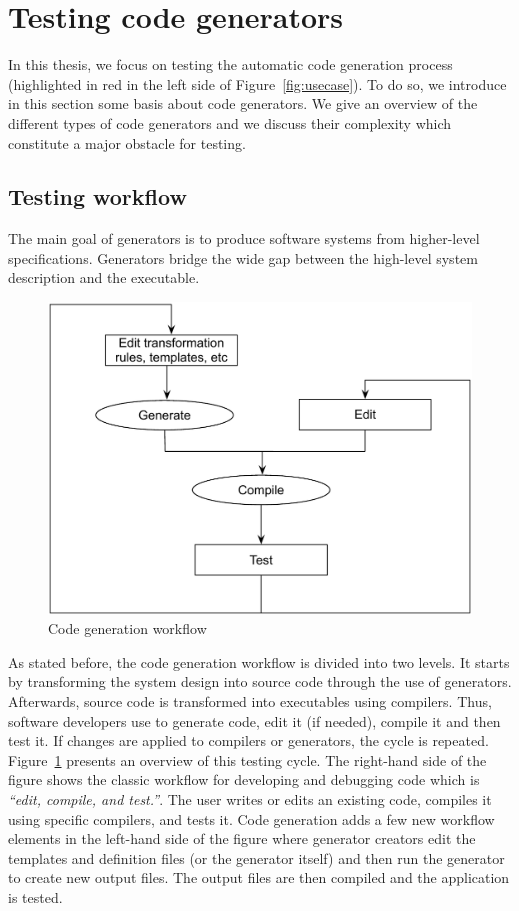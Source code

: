\section{Testing code generators}
\label{bg:Testing code generators}
In this thesis, we focus on testing the automatic code generation process (highlighted in red in the left side of Figure~\ref{fig:usecase}). To do so, we introduce in this section some basis about code generators. We give an overview of the different types of code generators and we discuss their complexity which constitute a major obstacle for testing.
\subsection{Testing workflow}
The main goal of generators is to produce software systems from higher-level specifications. Generators bridge the wide gap between the high-level system description and the executable.
\begin{figure}[h]
	\center
	\includegraphics[scale=0.7]{Background/fig/workflow}
	\caption{Code generation workflow}
	\label{fig:workflow}
\end{figure}

As stated before, the code generation workflow is divided into two levels. It starts by transforming the system design into source code through the use of generators. Afterwards, source code is transformed into executables using compilers. Thus, software developers use to generate code, edit it (if needed), compile it and then test it. If changes are applied to compilers or generators, the cycle is repeated. Figure~\ref{fig:workflow} presents an overview of this testing cycle. The right-hand side of the figure shows the classic workflow for developing and debugging code which is \textit{“edit, compile, and test.”}. The user writes or edits an existing code, compiles it using specific compilers, and tests it. Code generation adds a few new workflow elements in the left-hand side of the figure where generator creators edit the templates and definition files (or the generator itself) and then run the generator to create new output files. The output files are then compiled and the application is tested. 



